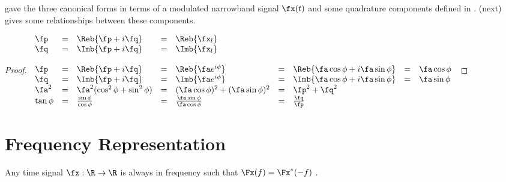  gave the three canonical forms  in terms of a
modulated narrowband signal $\fx(t)$ and some quadrature components defined in .
 (next) gives some relationships between these components.
\begin{proposition}
\label{prop:canforms_quad}
\end{proposition}
\begin{proof}
$\begin{array}{*{12}{l}}
   \fp
     &=& \Reb{\fp + i\fq}
     &=& \Reb{\fx_l}
\\
   \fq
     &=& \Imb{\fp + i\fq}
     &=& \Imb{\fx_l}
\\ \\
   \fp
     &=& \Reb{\fp + i\fq}
     &=& \Reb{\fa e^{i\phi}}
     &=& \Reb{\fa\cos\phi + i\fa\sin\phi}
     &=& \fa\cos\phi
\\
   \fq
     &=& \Imb{\fp + i\fq}
     &=& \Imb{\fa e^{i\phi}}
     &=& \Imb{\fa\cos\phi + i\fa\sin\phi}
     &=& \fa\sin\phi
\\
   \fa^2
     &=& \fa^2 (\cos^2\phi + \sin^2\phi)
     &=& (\fa \cos\phi)^2 + (\fa\sin\phi)^2
     &=& \fp^2 + \fq^2
\\
   \tan\phi
     &=& \frac{\sin\phi}{\cos\phi}
     &=& \frac{\fa\sin\phi}{\fa\cos\phi}
     &=& \frac{\fq}{\fp}
\end{array}$
\end{proof}

\section{Frequency Representation}
Any  time signal $\fx:\R\to\R$
is always  in frequency
such that $\Fx(f) =  \Fx^\ast(-f)$ .

